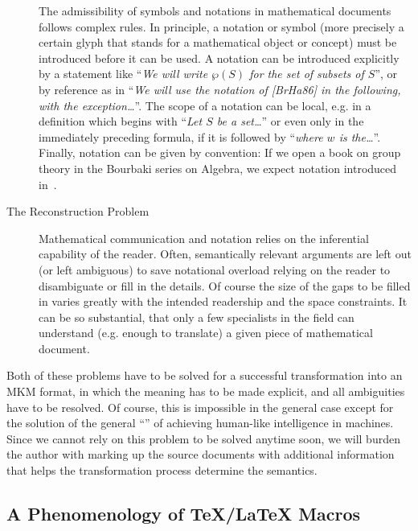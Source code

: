 \begin{description}
  The admissibility of symbols and notations in mathematical documents follows
  complex rules. In principle, a notation or symbol (more precisely a certain
  glyph that stands for a mathematical object or concept) must be introduced
  before it can be used. A notation can be introduced explicitly by a statement
  like ``{\em{We will write $\wp(S)$ for the set of subsets of $S$}}'', or by
  reference as in ``{\em{We will use the notation of [BrHa86] in the following,
      with the exception\ldots}}''. The scope of a notation can be local, e.g. in
  a definition which begins with ``{\em{Let $S$ be a set\ldots}}'' or even only in
  the immediately preceding formula, if it is followed by ``{\em{where $w$ is
      the\ldots}}''. Finally, notation can be given by convention: If we open a
  book on group theory in the Bourbaki series on Algebra, we expect notation
  introduced in~\cite{Bourbaki:a74}.

\item[The Reconstruction Problem] Mathematical communication and notation relies
  on the inferential capability of the reader. Often, semantically relevant
  arguments are left out (or left ambiguous) to save notational overload relying
  on the reader to disambiguate or fill in the details. Of course the size of the
  gaps to be filled in varies greatly with the intended readership and the space
  constraints. It can be so substantial, that only a few specialists in the field
  can understand (e.g.  enough to translate) a given piece of mathematical
  document.
\end{description}
Both of these problems have to be solved for a successful transformation into an
MKM format, in which the meaning has to be made explicit, and all ambiguities have
to be resolved. Of course, this is impossible in the general case except for the
solution of the general ``{}'' of
achieving human-like intelligence in machines. Since we cannot rely on this
problem to be solved anytime soon, we will burden the author with marking up the
source documents with additional information that helps the transformation process
determine the semantics.

\subsection{A Phenomenology of {\TeX/\LaTeX} Macros}

